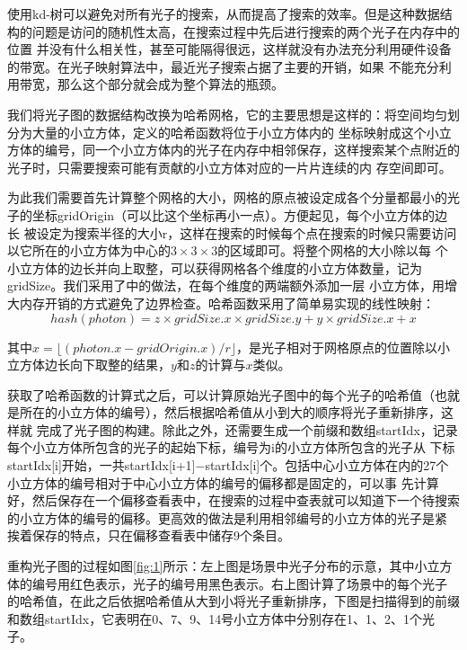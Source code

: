 \documentclass[UTF8]{ctexart}
\begin{document}
        使用kd-树可以避免对所有光子的搜索，从而提高了搜索的效率。但是这种数据结构的问题是访问的随机性太高，在搜索过程中先后进行搜索的两个光子在内存中的位置
        并没有什么相关性，甚至可能隔得很远，这样就没有办法充分利用硬件设备的带宽。在光子映射算法中，最近光子搜索占据了主要的开销\cite{gupte2011real}，如果
        不能充分利用带宽，那么这个部分就会成为整个算法的瓶颈。
        
        我们将光子图的数据结构改换为哈希网格\cite{fleisz2009photon}，它的主要思想是这样的：将空间均匀划分为大量的小立方体，定义的哈希函数将位于小立方体内的
        坐标映射成这个小立方体的编号，同一个小立方体内的光子在内存中相邻保存，这样搜索某个点附近的光子时，只需要搜索可能有贡献的小立方体对应的一片片连续的内
        存空间即可。
        
        为此我们需要首先计算整个网格的大小，网格的原点被设定成各个分量都最小的光子的坐标gridOrigin（可以比这个坐标再小一点）。方便起见，每个小立方体的边长
        被设定为搜索半径的大小r，这样在搜索的时候每个点在搜索的时候只需要访问以它所在的小立方体为中心的$3\times3\times3$的区域即可。将整个网格的大小除以每
        个小立方体的边长并向上取整，可以获得网格各个维度的小立方体数量，记为gridSize。我们采用了\cite{gupte2011real}中的做法，在每个维度的两端额外添加一层
        小立方体，用增大内存开销的方式避免了边界检查。哈希函数采用了简单易实现的线性映射：
        \begin{equation}
        hash(photon)=z \times gridSize.x \times gridSize.y + y \times gridSize.x + x
        \label{equ:2}
        \end{equation}
        
        其中$x=\lfloor(photon.x-gridOrigin.x)/r\rfloor$，是光子相对于网格原点的位置除以小立方体边长向下取整的结果，$y$和$z$的计算与$x$类似。
        
        获取了哈希函数的计算式之后，可以计算原始光子图中的每个光子的哈希值（也就是所在的小立方体的编号），然后根据哈希值从小到大的顺序将光子重新排序，这样就
        完成了光子图的构建。除此之外，还需要生成一个前缀和数组startIdx，记录每个小立方体所包含的光子的起始下标，编号为i的小立方体所包含的光子从
        下标startIdx[i]开始，一共startIdx[i+1]$-$startIdx[i]个。包括中心小立方体在内的27个小立方体的编号相对于中心小立方体的编号的偏移都是固定的，可以事
        先计算好，然后保存在一个偏移查看表中，在搜索的过程中查表就可以知道下一个待搜索的小立方体的编号的偏移。更高效的做法是利用相邻编号的小立方体的光子是紧
        挨着保存的特点，只在偏移查看表中储存9个条目。
        
        重构光子图的过程如图\ref{fig:1}所示：左上图是场景中光子分布的示意，其中小立方体的编号用红色表示，光子的编号用黑色表示。右上图计算了场景中的每个光子
        的哈希值，在此之后依据哈希值从大到小将光子重新排序，下图是扫描得到的前缀和数组startIdx，它表明在0、7、9、14号小立方体中分别存在1、1、2、1个光子。
        
\end{document}
